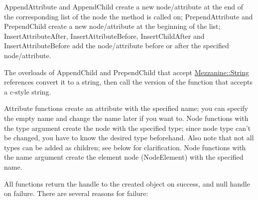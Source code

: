  AppendAttribute and AppendChild create a new node/attribute at the end of the corresponding list of the node the method is called on; PrependAttribute and PrependChild create a new node/attribute at the beginning of the list; InsertAttributeAfter, InsertAttributeBefore, InsertChildAfter and InsertAttributeBefore add the node/attribute before or after the specified node/attribute. \par
 \par
 The overloads of AppendChild and PrependChild that accept \hyperlink{namespaceMezzanine_acf9fcc130e6ebf08e3d8491aebcf1c86}{Mezzanine::String} references convert it to a string, then call the version of the function that accepts a c-\/style string. \par
 \par
 Attribute functions create an attribute with the specified name; you can specify the empty name and change the name later if you want to. Node functions with the type argument create the node with the specified type; since node type can't be changed, you have to know the desired type beforehand. Also note that not all types can be added as children; see below for clarification. Node functions with the name argument create the element node (NodeElement) with the specified name. \par
 \par
 All functions return the handle to the created object on success, and null handle on failure. There are several reasons for failure:
